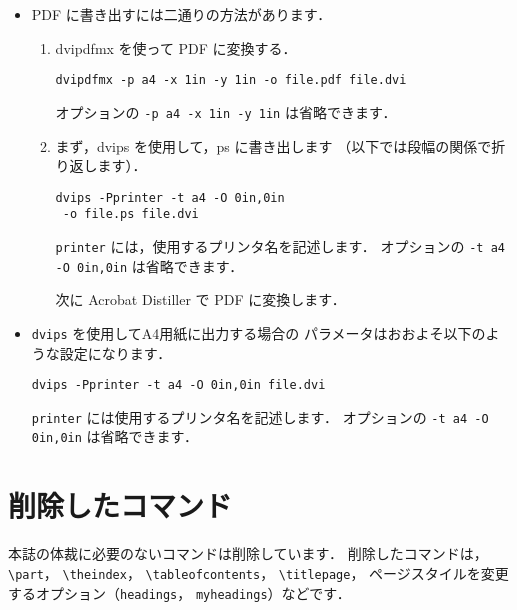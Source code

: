 \documentclass[technicalreport]{ieicej}
\begin{document}
\begin{itemize}
\item 
PDF に書き出すには二通りの方法があります．
\begin{enumerate}
\item
dvipdfmx を使って PDF に変換する．
\begin{verbatim}
dvipdfmx -p a4 -x 1in -y 1in -o file.pdf file.dvi
\end{verbatim}
オプションの \texttt{-p a4 -x 1in -y 1in} は省略できます．

\item
まず，dvips を使用して，ps に書き出します
（以下では段幅の関係で折り返します）．
\begin{verbatim}
dvips -Pprinter -t a4 -O 0in,0in
 -o file.ps file.dvi
\end{verbatim}
\texttt{printer} には，使用するプリンタ名を記述します．
オプションの \texttt{-t a4 -O 0in,0in} は省略できます．

次に Acrobat Distiller で PDF に変換します．
\end{enumerate}

\item
\texttt{dvips} を使用してA4用紙に出力する場合の
パラメータはおおよそ以下のような設定になります．
\begin{verbatim}
dvips -Pprinter -t a4 -O 0in,0in file.dvi
\end{verbatim}
\texttt{printer} には使用するプリンタ名を記述します．
オプションの \texttt{-t a4 -O 0in,0in} は省略できます．
\end{itemize}

%
%

\section{削除したコマンド}

本誌の体裁に必要のないコマンドは削除しています．
削除したコマンドは，\verb/\part/，\allowbreak
\verb/\theindex/，\allowbreak
\verb/\tableofcontents/，\allowbreak
\verb/\titlepage/，\allowbreak
ページスタイルを変更するオプション（\texttt{headings}，
\texttt{myheadings}）などです．
\end{document}
